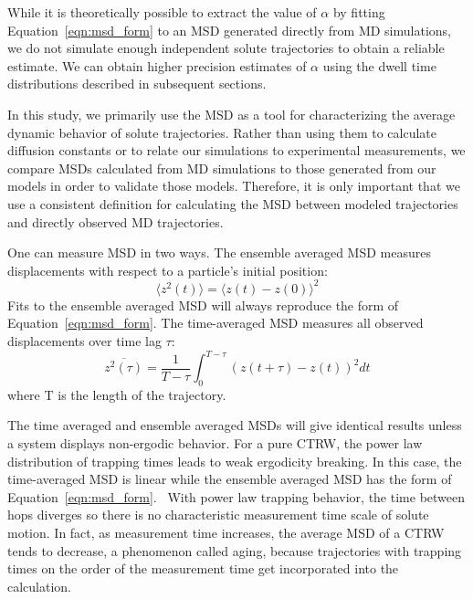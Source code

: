\documentclass[journal=ancac3,manuscript=article,layout=twocolumn]{achemso}
\begin{document}
  While it is theoretically possible to extract the value of $\alpha$ by fitting
  Equation~\ref{eqn:msd_form} to an MSD generated directly from MD simulations, 
  we do not simulate enough independent solute trajectories to obtain a reliable
  estimate. We can obtain higher precision estimates of $\alpha$ using the dwell
  time distributions described in subsequent sections.

  In this study, we primarily use the MSD as a tool for characterizing the average
  dynamic behavior of solute trajectories. Rather than using them to calculate 
  diffusion constants or to relate our simulations to experimental measurements, we
  compare MSDs calculated from MD simulations to those generated from our models 
  in order to validate those models. Therefore, it is only important that we use a
  consistent definition for calculating the MSD between modeled trajectories and
  directly observed MD trajectories.

  One can measure MSD in two ways. The ensemble averaged MSD measures 
  displacements with respect to a particle's initial position:
  \begin{equation}
  \langle z^2(t) \rangle = \langle z(t) - z(0) \rangle^2
  \label{eqn:ensemble_msd}
  \end{equation}
  Fits to the ensemble averaged MSD will always reproduce the form of 
  Equation~\ref{eqn:msd_form}. The time-averaged MSD measures all observed 
  displacements over time lag $\tau$: 
  \begin{equation}
  \overline{z^2(\tau)} = \dfrac{1}{T - \tau}\int_{0}^{T - \tau} (z(t + \tau) - z(t))^2 dt
  \label{eqn:tamsd}
  \end{equation}
  where T is the length of the trajectory. 
  
  The time averaged and ensemble averaged MSDs will give identical results 
  unless a system displays non-ergodic behavior. For a pure CTRW, the power 
  law distribution of trapping times leads to weak ergodicity breaking.
  In this case, the time-averaged MSD is linear while the ensemble averaged
  MSD has the form of Equation~\ref{eqn:msd_form}.~\cite{meroz_toolbox_2015} With
  power law trapping behavior, the time between hops diverges so there is no 
  characteristic measurement time scale of solute motion. In fact, as measurement 
  time increases, the average MSD of a CTRW tends to decrease, a phenomenon called
  aging, because trajectories with trapping times on the order of the measurement 
  time get incorporated into the calculation.~\cite{bel_weak_2005}
  
\end{document}
